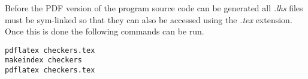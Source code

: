 Before the PDF version of the program source code can be generated all
\emph{.lhs} files must be sym-linked so that they can also be accessed
using the \emph{.tex} extension. Once this is done the following
commands can be run.

\begin{verbatim}
pdflatex checkers.tex
makeindex checkers
pdflatex checkers.tex
\end{verbatim}

